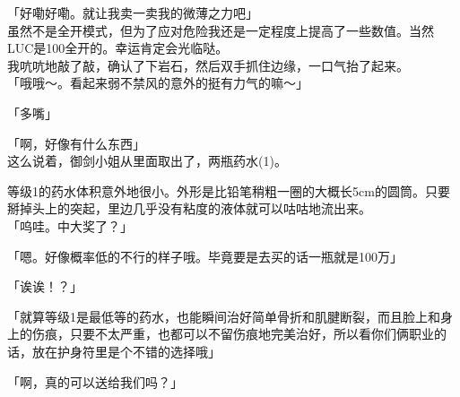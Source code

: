 「好嘞好嘞。就让我卖一卖我的微薄之力吧」\\

虽然不是全开模式，但为了应对危险我还是一定程度上提高了一些数值。当然LUC是100全开的。幸运肯定会光临哒。\\

我吭吭地敲了敲，确认了下岩石，然后双手抓住边缘，一口气抬了起来。\\

「哦哦～。看起来弱不禁风的意外的挺有力气的嘛～」

「多嘴」

「啊，好像有什么东西」\\

这么说着，御剑小姐从里面取出了，两瓶药水(1)。

等级1的药水体积意外地很小。外形是比铅笔稍粗一圈的大概长5cm的圆筒。只要掰掉头上的突起，里边几乎没有粘度的液体就可以咕咕地流出来。\\

「呜哇。中大奖了？」

「嗯。好像概率低的不行的样子哦。毕竟要是去买的话一瓶就是100万」

「诶诶！？」

「就算等级1是最低等的药水，也能瞬间治好简单骨折和肌腱断裂，而且脸上和身上的伤痕，只要不太严重，也都可以不留伤痕地完美治好，所以看你们俩职业的话，放在护身符里是个不错的选择哦」

「啊，真的可以送给我们吗？」

